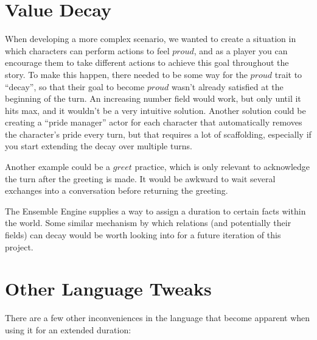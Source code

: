 \section{Value Decay} \label{sec:ValueDecay}

When developing a more complex scenario, we wanted to create a situation
in which characters can perform actions to feel $proud$, and as a player you can
encourage them to take different actions to achieve this goal throughout the story.
To make this happen, there needed to be some way for the $proud$ trait to ``decay'',
so that their goal to become $proud$ wasn't already satisfied at the beginning of the
turn. An increasing number field would work, but only until it hits max, and it wouldn't
be a very intuitive solution. Another solution could be creating a ``pride manager''
actor for each character that automatically removes the character's pride every turn, but
that requires a lot of scaffolding, especially if you start extending the decay over
multiple turns.

Another example could be a $greet$ practice, which is only relevant to acknowledge
the turn after the greeting is made. It would be awkward to wait several exchanges
into a conversation before returning the greeting.

The Ensemble Engine supplies a way to assign a duration to certain facts within the
world. \cite{samuel_ensemble_2015} Some similar mechanism by which relations (and
potentially their fields) can decay would be worth looking into for a future iteration
of this project.

\section{Other Language Tweaks} \label{sec:OtherLanguageTweaks}

There are a few other inconveniences in the language that become apparent when using it
for an extended duration:

